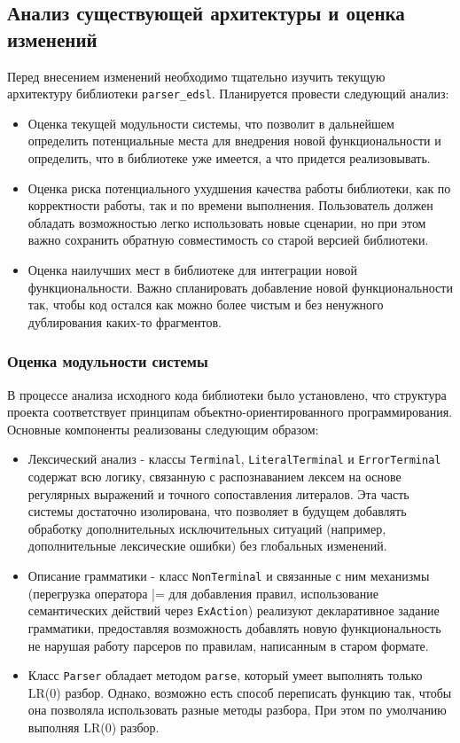 \documentclass[14pt, russian]{scrartcl}
\begin{document}
\subsection{Анализ существующей архитектуры и оценка изменений}

Перед внесением изменений необходимо тщательно изучить текущую архитектуру библиотеки \texttt{parser\_edsl}.
Планируется провести следующий анализ:
\begin{itemize}
	\item Оценка текущей модульности системы, что позволит в дальнейшем определить потенциальные места для внедрения новой
	функциональности и определить, что в библиотеке уже имеется, а что придется реализовывать.
	\item Оценка риска потенциального ухудшения качества работы библиотеки, как по корректности работы, так и по
	времени выполнения. Пользователь должен обладать возможностью легко использовать новые сценарии,
	но при этом важно сохранить обратную совместимость со старой
	версией библиотеки.
	\item Оценка наилучших мест в библиотеке для интеграции новой функциональности. Важно спланировать добавление
	новой функциональности так, чтобы код остался как можно более чистым и без ненужного дублирования каких-то
	фрагментов.
\end{itemize}

\subsubsection{Оценка модульности системы}

В процессе анализа исходного кода библиотеки было установлено, что структура проекта соответствует принципам
объектно-ориентированного программирования. Основные компоненты реализованы следующим образом:

\begin{itemize}
	\item Лексический анализ - классы \texttt{Terminal}, \texttt{LiteralTerminal} и \texttt{ErrorTerminal} содержат всю логику,
	связанную с распознаванием лексем на основе регулярных выражений и точного сопоставления литералов.
	Эта часть системы достаточно изолирована, что позволяет в будущем добавлять обработку дополнительных исключительных
	ситуаций (например, дополнительные лексические ошибки) без глобальных изменений.
	\item Описание грамматики - класс \texttt{NonTerminal} и связанные с ним механизмы (перегрузка оператора |= для
	добавления правил, использование семантических действий через \texttt{ExAction}) реализуют декларативное
	задание грамматики, предоставляя возможность добавлять новую функциональность не нарушая работу парсеров по правилам,
	написанным в старом формате.
	\item Класс \texttt{Parser} обладает методом \texttt{parse}, который умеет выполнять только LR(0) разбор.
	Однако, возможно есть способ переписать функцию так, чтобы она позволяла использовать разные методы разбора,
	При этом по умолчанию выполняя LR(0) разбор.
\end{itemize}
\end{document}
